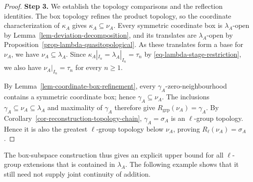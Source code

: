 \documentclass[preprint,3p]{elsarticle}
\theoremstyle{plain}
\theoremstyle{definition}
\numberwithin{equation}{section}
\begin{document}
\begin{proof}
\textbf{Step 3.} We establish the topology comparisons and the
reflection identities.
The box topology refines the product topology, so the coordinate
characterization of $\kappa_A$ gives
$\kappa_A\subseteq\nu_A$.
Every symmetric coordinate box is $\lambda_A$-open by
Lemma~\ref{lem-deviation-decomposition}, and its translates are
$\lambda_A$-open by Proposition~\ref{prop-lambda-quasitopological}.
As these translates form a base for
$\nu_A$, we have $\nu_A\subseteq\lambda_A$.
Since $\kappa_A|_{I_n}=\lambda_A|_{I_n}=\tau_n$ by
\eqref{eq-lambda-stage-restriction}, we also have
$\nu_A|_{I_n}=\tau_n$ for every $n\geq1$.

By Lemma~\ref{lem-coordinate-box-refinement}, every
$\gamma_A$-zero-neighbourhood contains a symmetric coordinate box;
hence $\gamma_A\subseteq\nu_A$.
The inclusions $\gamma_A\subseteq\nu_A\subseteq\lambda_A$
and maximality of $\gamma_A$ therefore give
$R_{\mathrm{grp}}(\nu_A)=\gamma_A$.
By Corollary~\ref{cor-reconstruction-topology-chain},
$\gamma_A=\sigma_A$ is an $\ell$-group topology.  Hence it is also the greatest
$\ell$-group topology below $\nu_A$, proving
$R_\ell(\nu_A)=\sigma_A$.
\end{proof}

The box-subspace construction thus gives an explicit upper bound
for all $\ell$-group extensions that is contained in $\lambda_A$.
The following example shows that it still need not supply joint
continuity of addition.
\end{document}
